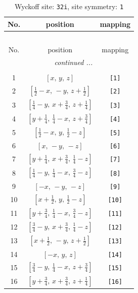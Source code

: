\documentclass[fleqn,8pt]{jsarticle}
\begin{document}
\begin{longtable}{ccc}
\caption{Wyckoff site: {\tt 32i}, site symmetry: {\tt 1}}
 \\
 \hline \hline
No. & position & mapping \\ \hline \endfirsthead

\multicolumn{2}{l}{\tablename\ \thetable{}} \\
 \hline \hline
No. & position & mapping \\ \hline \endhead

 \hline \hline
\multicolumn{2}{r}{\footnotesize\it continued ...} \\ \endfoot

 \hline \hline
\multicolumn{2}{r}{} \\ \endlastfoot

1 & $\left[ x,\, y,\, z \right]$ & {\tt [1]} \\ \hline
2 & $\left[ \frac{1}{2} - x,\, - y,\, z + \frac{1}{2} \right]$ & {\tt [2]} \\ \hline
3 & $\left[ \frac{1}{4} - y,\, x + \frac{3}{4},\, z + \frac{1}{4} \right]$ & {\tt [3]} \\ \hline
4 & $\left[ y + \frac{1}{4},\, \frac{1}{4} - x,\, z + \frac{3}{4} \right]$ & {\tt [4]} \\ \hline
5 & $\left[ \frac{1}{2} - x,\, y,\, \frac{1}{2} - z \right]$ & {\tt [5]} \\ \hline
6 & $\left[ x,\, - y,\, - z \right]$ & {\tt [6]} \\ \hline
7 & $\left[ y + \frac{1}{4},\, x + \frac{3}{4},\, \frac{1}{4} - z \right]$ & {\tt [7]} \\ \hline
8 & $\left[ \frac{1}{4} - y,\, \frac{1}{4} - x,\, \frac{3}{4} - z \right]$ & {\tt [8]} \\ \hline
9 & $\left[ - x,\, - y,\, - z \right]$ & {\tt [9]} \\ \hline
10 & $\left[ x + \frac{1}{2},\, y,\, \frac{1}{2} - z \right]$ & {\tt [10]} \\ \hline
11 & $\left[ y + \frac{3}{4},\, \frac{1}{4} - x,\, \frac{3}{4} - z \right]$ & {\tt [11]} \\ \hline
12 & $\left[ \frac{3}{4} - y,\, x + \frac{3}{4},\, \frac{1}{4} - z \right]$ & {\tt [12]} \\ \hline
13 & $\left[ x + \frac{1}{2},\, - y,\, z + \frac{1}{2} \right]$ & {\tt [13]} \\ \hline
14 & $\left[ - x,\, y,\, z \right]$ & {\tt [14]} \\ \hline
15 & $\left[ \frac{3}{4} - y,\, \frac{1}{4} - x,\, z + \frac{3}{4} \right]$ & {\tt [15]} \\ \hline
16 & $\left[ y + \frac{3}{4},\, x + \frac{3}{4},\, z + \frac{1}{4} \right]$ & {\tt [16]} \\
\end{longtable}
\end{document}
